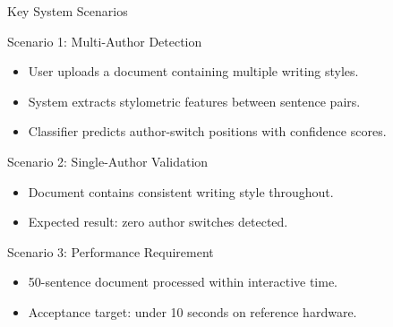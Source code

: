 \documentclass[compress,aspectratio=169]{beamer}
\begin{document}

\begin{frame}{Key System Scenarios}
\begin{block}{Scenario 1: Multi-Author Detection}
\begin{itemize}
\item User uploads a document containing multiple writing styles.
\item System extracts stylometric features between sentence pairs.
\item Classifier predicts author-switch positions with confidence scores.
\end{itemize}
\end{block}

\vspace{0.2cm}

\begin{block}{Scenario 2: Single-Author Validation}
    \begin{itemize}
        \item Document contains consistent writing style throughout.
        \item Expected result: zero author switches detected.
    \end{itemize}
\end{block}

\vspace{0.2cm}

\begin{block}{Scenario 3: Performance Requirement}
    \begin{itemize}
        \item 50-sentence document processed within interactive time.
        \item Acceptance target: under 10 seconds on reference hardware.
    \end{itemize}
\end{block}
\end{frame}

\end{document}
